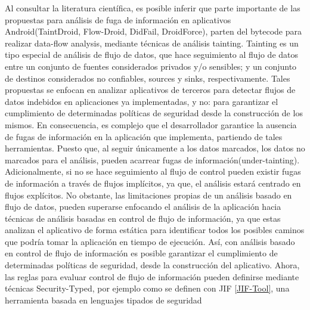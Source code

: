 Al consultar la literatura científica, es posible inferir que parte importante
de las propuestas para análisis de fuga de información en aplicativos
Android(TaintDroid\cite{TaintDroid}, Flow-Droid\cite{FlowDroid-Thesis},
DidFail\cite{DidFail}, DroidForce\cite{DroidForce}), parten del bytecode para
realizar data-flow analysis, mediante técnicas de análisis tainting. Tainting
es un tipo especial de análisis de flujo de datos, que hace seguimiento al flujo
de datos entre un conjunto de fuentes considerados privados y/o sensibles; y un
conjunto de destinos considerados no confiables, sources y sinks,
respectivamente.\newline 
Tales propuestas se enfocan en analizar aplicativos de terceros para detectar
flujos de datos indebidos en aplicaciones ya implementadas, y no: para
garantizar el cumplimiento de determinadas políticas de seguridad desde la
construcción de los mismos.
En consecuencia, es complejo que el desarrollador
garantice la ausencia de fugas de información en la aplicación que implementa,
partiendo de tales herramientas. Puesto que, al seguir únicamente a los datos
marcados, los datos no marcados para el análisis, pueden acarrear fugas de
información(under-tainting). Adicionalmente, si no se hace seguimiento al flujo
de control pueden existir fugas de información a través de flujos implícitos,
ya que, el análisis estará centrado en flujos explícitos.\newline
No obstante, las limitaciones propias de un análisis basado en flujo de datos,
pueden superarse enfocando el análisis de la aplicación hacia técnicas de
análisis basadas en control de flujo de información, ya que estas analizan el
aplicativo de forma estática para identificar todos los posibles caminos que
podría tomar la aplicación en tiempo de ejecución. 
Así, con análisis basado en
control de flujo de información es posible garantizar el cumplimiento
de determinadas políticas de seguridad, desde la construcción del
aplicativo.\newline 
Ahora, las reglas para evaluar control de flujo de
información pueden definirse mediante técnicas Security-Typed, por ejemplo como se definen con JIF \ref{JIF-Tool}, una herramienta basada en lenguajes tipados de seguridad
